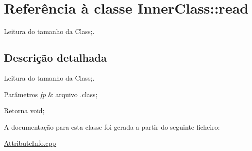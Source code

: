\hypertarget{class_inner_class_1_1read}{}\section{Referência à classe Inner\+Class\+:\+:read}
\label{class_inner_class_1_1read}


Leitura do tamanho da Class;.  




\subsection{Descrição detalhada}
Leitura do tamanho da Class;. 


\begin{DoxyParams}{Parâmetros}
{\em fp} & arquivo .class; \\
\hline
\end{DoxyParams}
\begin{DoxyReturn}{Retorna}
void; 
\end{DoxyReturn}


A documentação para esta classe foi gerada a partir do seguinte ficheiro\+:\begin{DoxyCompactItemize}
\item 
\hyperlink{_attribute_info_8cpp}{Attribute\+Info.\+cpp}\end{DoxyCompactItemize}
